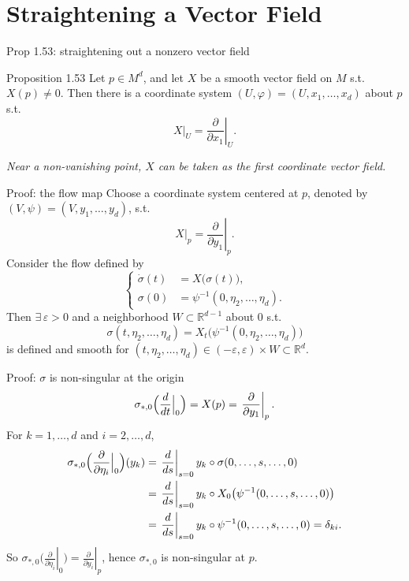 \documentclass[10pt]{beamer}
\newcommand{\R}{\mathbb{R}}
\begin{document}
\section{Straightening a Vector Field}

\begin{frame}{Prop 1.53: straightening out a nonzero vector field}
	\begin{alertblock}{Proposition 1.53}
		Let $p \in M^d$, and let $X$ be a smooth vector field on $M$
		s.t.\ $X(p) \neq 0$. Then there is a coordinate system
		$(U, \varphi) = (U, x_1, \dots, x_d)$ about $p$ s.t.
		\[
			X\big|_U = \left. \frac{\partial}{\partial x_1} \right|_U .
		\]
	\end{alertblock}
	\medskip
	\begin{center}
		\emph{Near a non-vanishing point, $X$ can be taken as the
			first coordinate vector field.}
	\end{center}
\end{frame}

\begin{frame}{Proof: the flow map}
	Choose a coordinate system centered at $p$, denoted by
	$(V, \psi) = (V, y_1, \dots, y_d)$, s.t.
	\[
		X\big|_p = \left. \frac{\partial}{\partial y_1} \right|_{p}.
	\]
	Consider the flow defined by
	\[
		\left\{
		\begin{aligned}
			\dot{\sigma}(t) & = X\bigl(\sigma(t)\bigr), \\
			\sigma(0)       & = \psi^{-1}(0, \eta_2, \dots, \eta_d).
		\end{aligned}
		\right.
	\]
	Then $\exists\, \varepsilon > 0$ and a neighborhood
	$W \subset \R^{d-1}$ about $0$ s.t.
	\[
		\sigma(t, \eta_2, \dots, \eta_d)
		= X_t\bigl( \psi^{-1}(0, \eta_2, \dots, \eta_d) \bigr)
	\]
	is defined and smooth for
	$(t, \eta_2, \dots, \eta_d) \in (-\varepsilon, \varepsilon)
	\times W \subset \R^d$.
\end{frame}

\begin{frame}{Proof: $\sigma$ is non-singular at the origin}
	\[
		\sigma_{*,0}\Bigl( \frac{d}{dt} \Big|_{0} \Bigr)
		= X(p) = \left. \frac{\partial}{\partial y_1} \right|_{p}.
	\]
	For $k = 1, \dots, d$ and $i = 2, \dots, d$,
	\begin{align*}
		\sigma_{*,0}\Bigl( \frac{\partial}{\partial \eta_i} \Big|_{0}
		\Bigr) (y_k)
		 & = \left. \frac{d}{ds} \right|_{s=0}
		y_k \circ \sigma(0, \dots, s, \dots, 0)  \\
		 & = \left. \frac{d}{ds} \right|_{s=0}
		y_k \circ X_0\bigl( \psi^{-1}(0, \dots, s, \dots, 0) \bigr) \\
		 & = \left. \frac{d}{ds} \right|_{s=0}
		y_k \circ \psi^{-1}(0, \dots, s, \dots, 0)
		= \delta_{ki}.
	\end{align*}
	So $\sigma_{*,0}\bigl( \left. \frac{\partial}{\partial \eta_i}
		\right|_{0} \bigr) = \left. \frac{\partial}{\partial y_i}
		\right|_{p}$, hence $\sigma_{*,0}$ is non-singular at $p$.
\end{frame}
\end{document}
